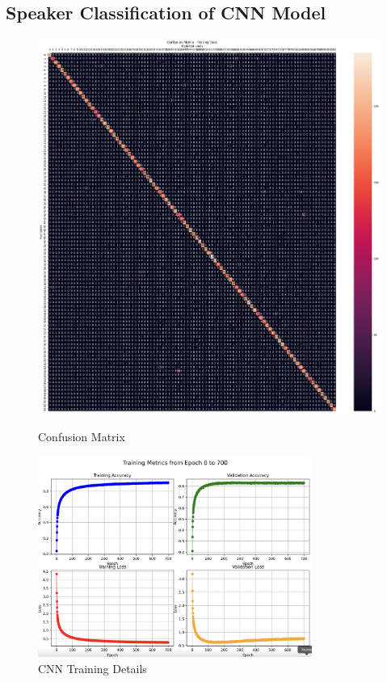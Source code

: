 \subsection{Speaker Classification of CNN Model}
\label{subsec:speaker classification of cnn model}
\begin{figure}[!h]
    \begin{minipage}[b]{0.33\textwidth}
            \centering
            \includegraphics[width=\textwidth]{images/5.01 CCN Confusion Matrix.png}
            \caption{Confusion Matrix}
            \label{fig:confusion matrix}
    \end{minipage}
    \hfill
    \begin{minipage}[b]{0.67\textwidth}
            \centering
            \includegraphics[width=0.8\textwidth]{images/5.02 CNN Training Details.png}
            \caption{CNN Training Details}
            \label{fig:cnn training details}
    \end{minipage}
\end{figure}
